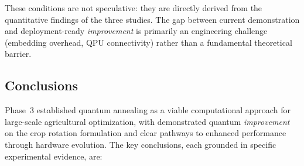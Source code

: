 These conditions are not speculative: they are directly derived from the quantitative findings of the three studies. The gap between current demonstration and deployment-ready \textit{improvement} is primarily an engineering challenge (embedding overhead, QPU connectivity) rather than a fundamental theoretical barrier.

\subsection{Conclusions}

Phase~3 established quantum annealing as a viable computational approach for large-scale agricultural optimization, with demonstrated quantum \textit{improvement} on the crop rotation formulation and clear pathways to enhanced performance through hardware evolution. The key conclusions, each grounded in specific experimental evidence, are:

